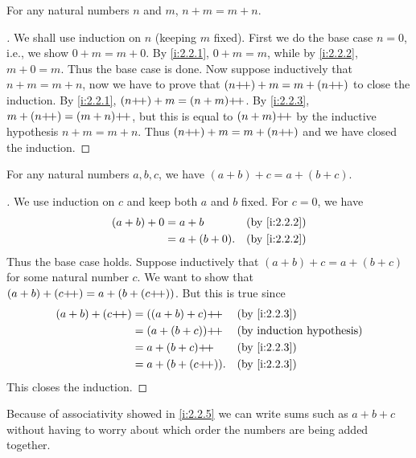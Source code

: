 \begin{prop}\label{i:2.2.4}
  For any natural numbers \(n\) and \(m\), \(n + m = m + n\).
\end{prop}

\begin{proof}[]
  We shall use induction on \(n\) (keeping \(m\) fixed).
  First we do the base case \(n = 0\), i.e., we show \(0 + m = m + 0\).
  By \cref{i:2.2.1}, \(0 + m = m\), while by \cref{i:2.2.2}, \(m + 0 = m\).
  Thus the base case is done.
  Now suppose inductively that \(n + m = m + n\), now we have to prove that \((n{+}\!{+}) + m = m + (n{+}\!{+})\) to close the induction.
  By \cref{i:2.2.1}, \((n{+}\!{+}) + m = (n + m){+}\!{+}\).
  By \cref{i:2.2.3}, \(m + (n{+}\!{+}) = (m + n){+}\!{+}\), but this is equal to \((n + m){+}\!{+}\) by the inductive hypothesis \(n+m=m+n\).
  Thus \((n{+}\!{+}) + m = m + (n{+}\!{+})\) and we have closed the induction.
\end{proof}

\begin{prop}\label{i:2.2.5}
  For any natural numbers \(a, b, c\), we have \((a + b) + c = a + (b + c)\).
\end{prop}

\begin{proof}[]
  We use induction on \(c\) and keep both \(a\) and \(b\) fixed.
  For \(c = 0\), we have
  \begin{align*}
    (a + b) + 0 & = a + b        &  & \by{i:2.2.2} \\
                & = a + (b + 0). &  & \by{i:2.2.2}
  \end{align*}
  Thus the base case holds.
  Suppose inductively that \((a + b) + c = a + (b + c)\) for some natural number \(c\).
  We want to show that \((a + b) + (c{+}\!{+}) = a + (b + (c{+}\!{+}))\).
  But this is true since
  \begin{align*}
    (a + b) + (c\pp) & = ((a + b) + c)\pp  &  & \by{i:2.2.3} \\
                     & = (a + (b + c))\pp  &  & \byIH        \\
                     & = a + (b + c)\pp    &  & \by{i:2.2.3} \\
                     & = a + (b + (c\pp)). &  & \by{i:2.2.3}
  \end{align*}
  This closes the induction.
\end{proof}

\begin{note}
  Because of associativity showed in \cref{i:2.2.5} we can write sums such as \(a + b + c\) without having to worry about which order the numbers are being added together.
\end{note}

